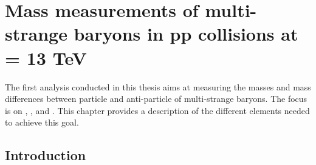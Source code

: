 \chapter{Mass measurements of multi-strange baryons in pp collisions at \sqrtS = 13 TeV}
\label{chap:CPTAnalysis}

The first analysis conducted in this thesis aims at measuring the masses and mass differences between particle and anti-particle of multi-strange baryons. The focus is on \rmXiM, \rmAxiP, \rmOmegaM and \rmAomegaP. This chapter provides a description of the different elements needed to achieve this goal. 

\section{Introduction}



